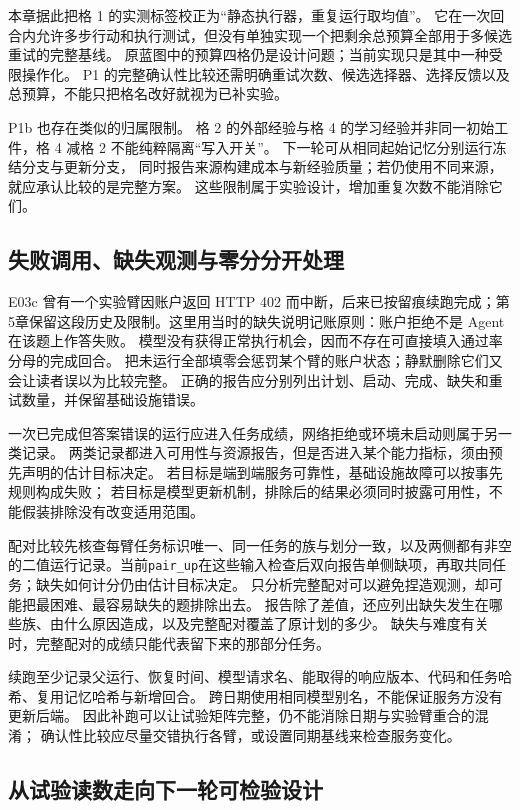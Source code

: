 本章据此把格 1 的实测标签校正为“静态执行器，重复运行取均值”。
它在一次回合内允许多步行动和执行测试，但没有单独实现一个把剩余总预算全部用于多候选重试的完整基线。
原蓝图中的预算四格仍是设计问题；当前实现只是其中一种受限操作化。
P1 的完整确认性比较还需明确重试次数、候选选择器、选择反馈以及总预算，不能只把格名改好就视为已补实验。

P1b 也存在类似的归属限制。
格 2 的外部经验与格 4 的学习经验并非同一初始工件，格 4 减格 2 不能纯粹隔离“写入开关”。
下一轮可从相同起始记忆分别运行冻结分支与更新分支，
同时报告来源构建成本与新经验质量；若仍使用不同来源，就应承认比较的是完整方案。
这些限制属于实验设计，增加重复次数不能消除它们。

\subsection{失败调用、缺失观测与零分分开处理}

E03c 曾有一个实验臂因账户返回 HTTP 402 而中断，后来已按留痕续跑完成；第5章保留这段历史及限制。这里用当时的缺失说明记账原则：账户拒绝不是 Agent 在该题上作答失败。
模型没有获得正常执行机会，因而不存在可直接填入通过率分母的完成回合。
把未运行全部填零会惩罚某个臂的账户状态；静默删除它们又会让读者误以为比较完整。
正确的报告应分别列出计划、启动、完成、缺失和重试数量，并保留基础设施错误。

一次已完成但答案错误的运行应进入任务成绩，网络拒绝或环境未启动则属于另一类记录。
两类记录都进入可用性与资源报告，但是否进入某个能力指标，须由预先声明的估计目标决定。
若目标是端到端服务可靠性，基础设施故障可以按事先规则构成失败；
若目标是模型更新机制，排除后的结果必须同时披露可用性，不能假装排除没有改变适用范围。

配对比较先核查每臂任务标识唯一、同一任务的族与划分一致，以及两侧都有非空的二值运行记录。当前\texttt{pair\_up}在这些输入检查后双向报告单侧缺项，再取共同任务；缺失如何计分仍由估计目标决定。
只分析完整配对可以避免捏造观测，却可能把最困难、最容易缺失的题排除出去。
报告除了差值，还应列出缺失发生在哪些族、由什么原因造成，以及完整配对覆盖了原计划的多少。
缺失与难度有关时，完整配对的成绩只能代表留下来的那部分任务。

续跑至少记录父运行、恢复时间、模型请求名、能取得的响应版本、代码和任务哈希、复用记忆哈希与新增回合。
跨日期使用相同模型别名，不能保证服务方没有更新后端。
因此补跑可以让试验矩阵完整，仍不能消除日期与实验臂重合的混淆；
确认性比较应尽量交错执行各臂，或设置同期基线来检查服务变化。

\subsection{从试验读数走向下一轮可检验设计}

